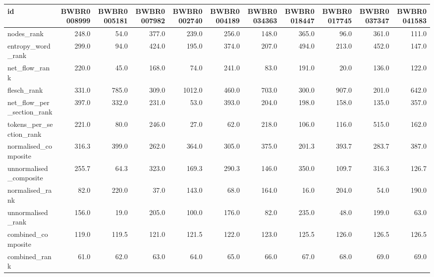 \begin{tabular}{lrrrrrrrrrr}
\toprule
id & BWBR0008999 & BWBR0005181 & BWBR0007982 & BWBR0002740 & BWBR0004189 & BWBR0034363 & BWBR0018447 & BWBR0017745 & BWBR0037347 & BWBR0041583 \\
\midrule
nodes\_rank & 248.0 & 54.0 & 377.0 & 239.0 & 256.0 & 148.0 & 365.0 & 96.0 & 361.0 & 111.0 \\
\cline{1-11}
entropy\_word\_rank & 299.0 & 94.0 & 424.0 & 195.0 & 374.0 & 207.0 & 494.0 & 213.0 & 452.0 & 147.0 \\
\cline{1-11}
net\_flow\_rank & 220.0 & 45.0 & 168.0 & 74.0 & 241.0 & 83.0 & 191.0 & 20.0 & 136.0 & 122.0 \\
\cline{1-11}
flesch\_rank & 331.0 & 785.0 & 309.0 & 1012.0 & 460.0 & 703.0 & 300.0 & 907.0 & 201.0 & 642.0 \\
\cline{1-11}
net\_flow\_per\_section\_rank & 397.0 & 332.0 & 231.0 & 53.0 & 393.0 & 204.0 & 198.0 & 158.0 & 135.0 & 357.0 \\
\cline{1-11}
tokens\_per\_section\_rank & 221.0 & 80.0 & 246.0 & 27.0 & 62.0 & 218.0 & 106.0 & 116.0 & 515.0 & 162.0 \\
\cline{1-11}
normalised\_composite & 316.3 & 399.0 & 262.0 & 364.0 & 305.0 & 375.0 & 201.3 & 393.7 & 283.7 & 387.0 \\
\cline{1-11}
unnormalised\_composite & 255.7 & 64.3 & 323.0 & 169.3 & 290.3 & 146.0 & 350.0 & 109.7 & 316.3 & 126.7 \\
\cline{1-11}
normalised\_rank & 82.0 & 220.0 & 37.0 & 143.0 & 68.0 & 164.0 & 16.0 & 204.0 & 54.0 & 190.0 \\
\cline{1-11}
unnormalised\_rank & 156.0 & 19.0 & 205.0 & 100.0 & 176.0 & 82.0 & 235.0 & 48.0 & 199.0 & 63.0 \\
\cline{1-11}
combined\_composite & 119.0 & 119.5 & 121.0 & 121.5 & 122.0 & 123.0 & 125.5 & 126.0 & 126.5 & 126.5 \\
\cline{1-11}
combined\_rank & 61.0 & 62.0 & 63.0 & 64.0 & 65.0 & 66.0 & 67.0 & 68.0 & 69.0 & 69.0 \\
\cline{1-11}
\bottomrule
\end{tabular}
